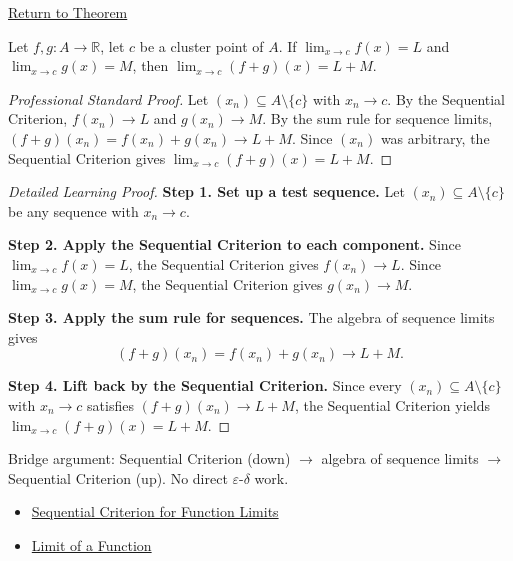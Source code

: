 \newpage
{}
\label{prf:limit-sum}

\begin{remark*}[Return]
\hyperref[thm:limit-sum]{Return to Theorem}
\end{remark*}

\begin{theorem*}
Let $f, g : A \to \mathbb{R}$, let $c$ be a cluster point of $A$. If
$\lim_{x\to c}f(x)=L$ and $\lim_{x\to c}g(x)=M$, then
$\lim_{x\to c}(f+g)(x) = L+M$.
\end{theorem*}

\begin{proof}[Professional Standard Proof]
\LRAProofBodyStart
Let $(x_n) \subseteq A \setminus \{c\}$ with $x_n \to c$.
By the Sequential Criterion, $f(x_n) \to L$ and $g(x_n) \to M$.
By the sum rule for sequence limits, $(f+g)(x_n) = f(x_n)+g(x_n) \to L+M$.
Since $(x_n)$ was arbitrary, the Sequential Criterion gives
$\lim_{x\to c}(f+g)(x) = L+M$.
\end{proof}

\begin{proof}[Detailed Learning Proof]
\LRAProofBodyStart
\textbf{Step 1. Set up a test sequence.}
Let $(x_n) \subseteq A \setminus \{c\}$ be any sequence with $x_n \to c$.

\textbf{Step 2. Apply the Sequential Criterion to each component.}
Since $\lim_{x\to c}f(x)=L$, the Sequential Criterion gives $f(x_n) \to L$.
Since $\lim_{x\to c}g(x)=M$, the Sequential Criterion gives $g(x_n) \to M$.

\textbf{Step 3. Apply the sum rule for sequences.}
The algebra of sequence limits gives
\[
  (f+g)(x_n) = f(x_n)+g(x_n) \to L+M.
\]

\textbf{Step 4. Lift back by the Sequential Criterion.}
Since every $(x_n) \subseteq A \setminus \{c\}$ with $x_n \to c$ satisfies
$(f+g)(x_n) \to L+M$, the Sequential Criterion yields
$\lim_{x\to c}(f+g)(x) = L+M$.
\end{proof}

\begin{remark*}
Bridge argument: Sequential Criterion (down) $\to$ algebra of sequence limits
$\to$ Sequential Criterion (up). No direct $\varepsilon$-$\delta$ work.
\end{remark*}

\begin{dependencies}
\begin{itemize}
  \item \hyperref[prop:sequential-criterion-limits]{Sequential Criterion for Function Limits}
  \item \hyperref[def:limit-function]{Limit of a Function}
\end{itemize}
\end{dependencies}

\clearpage
